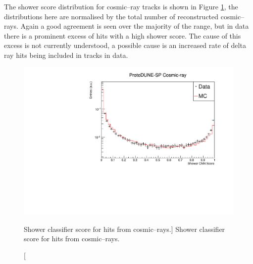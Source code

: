 The shower score distribution for cosmic--ray tracks is shown in Figure
\ref{fig:cosmic_muon_cnn}, the distributions here are normalised by the total
number of reconstructed cosmic--rays. Again a good agreement is seen over the 
majority of the range, but in data there is a prominent excess of hits with a 
high shower score. The cause of this excess is not currently understood, a 
possible cause is an increased rate of delta ray hits being included in tracks 
in data.
\begin{figure}
	\centering
	\includegraphics[width=\textwidth]{figures/hit_cnn_cosmics.pdf}
	\caption
	[Shower classifier score for hits from cosmic--rays.]
	{Shower classifier score for hits from cosmic--rays.}
	\label{fig:cosmic_muon_cnn}
\end{figure}

